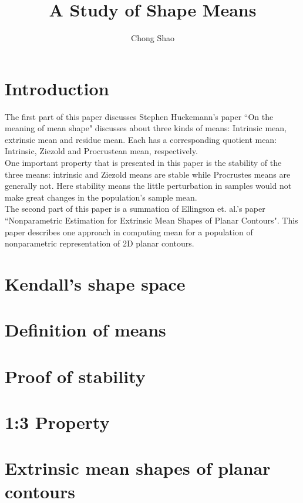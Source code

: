 \documentclass[12pt]{article}
\theoremstyle{definition}
\theoremstyle{remark}
\numberwithin{equation}{section}
\begin{document}
\title{
A Study of Shape Means}%
\author{Chong Shao}%

\maketitle
\section{Introduction}
The first part of this paper discusses Stephen Huckemann's paper ``On the meaning of mean shape" discusses about three kinds of means: Intrinsic mean, extrinsic mean and residue mean. Each has a corresponding quotient mean: Intrinsic, Ziezold and Procrustean mean, respectively. \\[0.2cm]
One important property that is presented in this paper is the stability of the three means: intrinsic and Ziezold means are stable while Procrustes means are generally not. Here stability means the little perturbation in samples would not make great changes in the population's sample mean. \\[0.2cm]
The second part of this paper is a summation of Ellingson et. al.'s paper ``Nonparametric Estimation for Extrinsic Mean Shapes of Planar Contours". This paper describes one approach in computing mean for a population of nonparametric representation of 2D planar contours.
\section{Kendall's shape space}
\section{Definition of means}
\section{Proof of stability}
\section{1:3 Property}
\section{Extrinsic mean shapes of planar contours}
\end{document}
